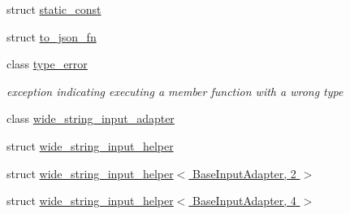 \begin{DoxyCompactItemize}
\item 
struct \hyperlink{structnlohmann_1_1detail_1_1static__const}{static\+\_\+const}
\item 
struct \hyperlink{structnlohmann_1_1detail_1_1to__json__fn}{to\+\_\+json\+\_\+fn}
\item 
class \hyperlink{classnlohmann_1_1detail_1_1type__error}{type\+\_\+error}
\begin{DoxyCompactList}\small\item\em exception indicating executing a member function with a wrong type \end{DoxyCompactList}\item 
class \hyperlink{classnlohmann_1_1detail_1_1wide__string__input__adapter}{wide\+\_\+string\+\_\+input\+\_\+adapter}
\item 
struct \hyperlink{structnlohmann_1_1detail_1_1wide__string__input__helper}{wide\+\_\+string\+\_\+input\+\_\+helper}
\item 
struct \hyperlink{structnlohmann_1_1detail_1_1wide__string__input__helper_3_01BaseInputAdapter_00_012_01_4}{wide\+\_\+string\+\_\+input\+\_\+helper$<$ Base\+Input\+Adapter, 2 $>$}
\item 
struct \hyperlink{structnlohmann_1_1detail_1_1wide__string__input__helper_3_01BaseInputAdapter_00_014_01_4}{wide\+\_\+string\+\_\+input\+\_\+helper$<$ Base\+Input\+Adapter, 4 $>$}
\end{DoxyCompactItemize}
